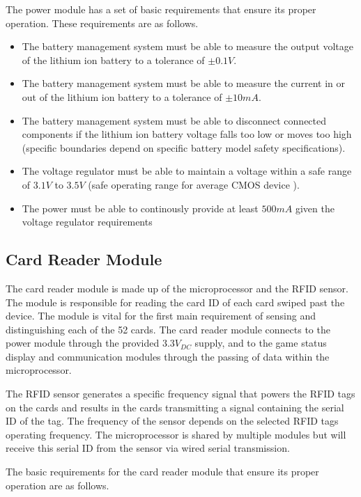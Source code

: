 \documentclass[12pt]{article}
\begin{document}
The power module has a set of basic requirements that ensure its proper operation. These requirements are as follows.

\begin{itemize}
\item The battery management system must be able to measure the output voltage of the lithium ion battery to a tolerance of $\pm0.1V$.
\item The battery management system must be able to measure the current in or out of the lithium ion battery to a tolerance of $\pm10mA$.
\item The battery management system must be able to disconnect connected components if the lithium ion battery voltage falls too low or moves too high (specific boundaries depend on specific battery model safety specifications).
\item The voltage regulator must be able to maintain a voltage within a safe range of $3.1V$ to $3.5V$ (safe operating range for average CMOS device \cite{TI_inverter}).
\item The power must be able to continously provide at least $500mA$ given the voltage regulator requirements
\end{itemize}

\subsection{Card Reader Module}

The card reader module is made up of the microprocessor and the RFID sensor. The module is responsible for reading the card ID of each card swiped past the device. The module is vital for the first main requirement of sensing and distinguishing each of the 52 cards. The card reader module connects to the power module through the provided $3.3V_{DC}$ supply, and to the game status display and communication modules through the passing of data within the microprocessor.

The RFID sensor generates a specific frequency signal that powers the RFID tags on the cards and results in the cards transmitting a signal containing the serial ID of the tag. The frequency of the sensor depends on the selected RFID tags operating frequency. The microprocessor is shared by multiple modules but will receive this serial ID from the sensor via wired serial transmission.

The basic requirements for the card reader module that ensure its proper operation are as follows.
\end{document}
